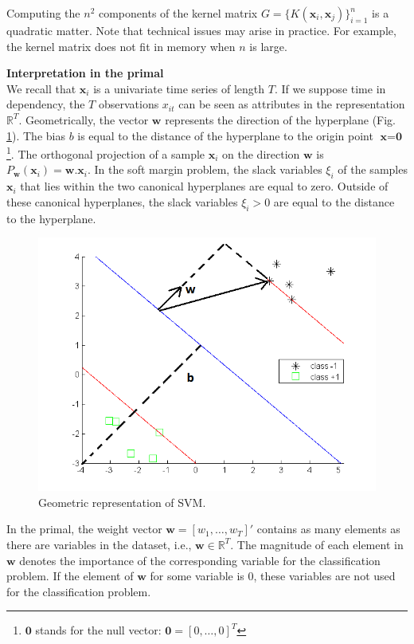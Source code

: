Computing the $n^2$ components of the kernel matrix $G = \{K(\textbf{x}_i
, \textbf{x}_j)\}_{i=1}^n$ is a quadratic matter. Note that technical issues may arise in practice. For example, the kernel matrix does not fit in memory when $n$ is large.


\noindent \textbf{Interpretation in the primal} \\
We recall that $\textbf{x}_i$ is a univariate time series of length $T$. If we suppose time in dependency, the $T$ observations $x_{it}$ can be seen as attributes in the representation $\mathbb{R}^T$. Geometrically, the vector $\textbf{w}$ represents the direction of the hyperplane (Fig. \ref{fig:SVM_interpretation}). The bias $b$ is equal to the distance of the hyperplane to the origin point $\textbf{x}=\textbf{0}$\footnote{$\textbf{0}$ stands for the null vector: $\textbf{0} = [0, \ldots ,0]^T$}. The orthogonal projection of a sample $\textbf{x}_i$ on the direction $\textbf{w}$ is $P_\textbf{w}(\textbf{x}_i) = \textbf{w}.\textbf{x}_i$. In the soft margin problem, the slack variables $\xi_i$ of the samples $\textbf{x}_i$ that lies within the two canonical hyperplanes are equal to zero. Outside of these canonical hyperplanes, the slack variables $\xi_i > 0$ are equal to the distance to the hyperplane.

\begin{figure}[h!]
	\centering
	\includegraphics[width=0.6\linewidth]{images/SVM_interpretation2}
	\caption{Geometric representation of SVM.}
	\label{fig:SVM_interpretation}
\end{figure}

In the primal, the weight vector $\textbf{w} = [w_1, \ldots, w_T]'$ contains as many elements as there are variables in the dataset, i.e., $\textbf{w} \in \mathbb{R}^T$. The magnitude of each element in $\textbf{w}$ denotes the importance of the corresponding variable for the classification problem. If the element of $\textbf{w}$ for some variable is 0, these variables are not used for the classification problem.

